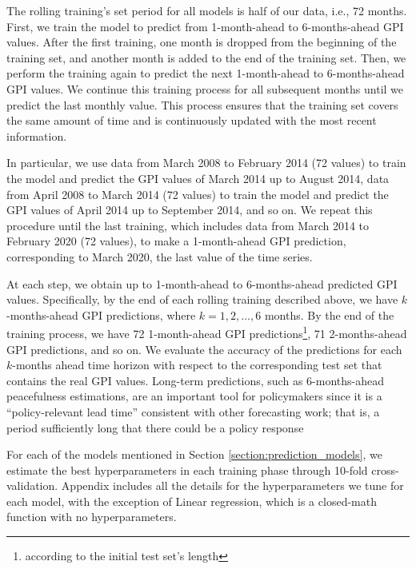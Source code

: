 \documentclass{bmcart}
\begin{document}
The rolling training's set period for all models is half of our data, i.e., 72 months. First, we train the model to predict from 1-month-ahead to 6-months-ahead GPI values. 
After the first training, one month is dropped from the beginning of the training set, and another month is added to the end of the training set. Then, we perform the training again to predict the next 1-month-ahead to 6-months-ahead GPI values. 
We continue this training process for all subsequent months until we predict the last monthly value. 
This process ensures that the training set covers the same amount of time and is continuously updated with the most recent information.

In particular, we use data from March 2008 to February 2014 (72 values) to train the model and predict the GPI values of March 2014 up to August 2014, data from April 2008 to March 2014 (72 values) to train the model and predict the GPI values of April 2014 up to September 2014, and so on.
We repeat this procedure until the last training, which includes data from March 2014 to February 2020 (72 values), to make a 1-month-ahead GPI prediction, corresponding to March 2020, the last value of the time series.

At each step, we obtain up to 1-month-ahead to 6-months-ahead predicted GPI values.
Specifically, by the end of each rolling training described above, we have $k$-months-ahead GPI predictions, where $k=1,2,\dots,6$ months. By the end of the training process, we have 72 1-month-ahead GPI predictions\footnote{according to the initial test set's length}, 71 2-months-ahead GPI predictions, and so on. 
We evaluate the accuracy of the predictions for each $k$-months ahead time horizon with respect to the corresponding test set that contains the real GPI values. 
Long-term predictions, such as 6-months-ahead peacefulness estimations, are an important tool for policymakers since it is a ``policy-relevant lead time'' consistent with other forecasting work; that is,
a period sufficiently long that there could be a policy response \cite{schrodt2011forecasting}

For each of the models mentioned in Section \ref{section:prediction_models}, we estimate the best hyperparameters in each training phase through 10-fold cross-validation. Appendix  includes all the details for the hyperparameters we tune for each model, with the exception of Linear regression, which is a closed-math function with no hyperparameters.
\end{document}
